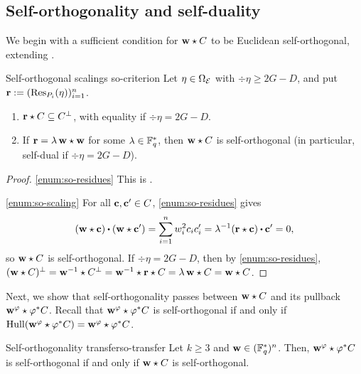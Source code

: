 \documentclass[twocolumn, 11pt]{scrartcl}
\begin{document}
\subsection{Self-orthogonality and self-duality} \label{subsection:self-dual}

We begin with a sufficient condition for $\mathbf{w}\star C$ to be Euclidean self-orthogonal, extending \cite[Lem.~3--4]{wang2026generic}.

\begin{lemma}{Self-orthogonal scalings \cite{wang2026generic}}{so-criterion}
    Let $\eta\in\Omega_\mathcal{E}$ with $\div\eta\geq2G-D$, and put $\mathbf{r}:=(\operatorname{Res}_{P_i}(\eta))_{i=1}^n$.
    \begin{enumerate}[label={(\alph*)}, left=-4pt, topsep=2pt, itemsep=0pt]
        \item \label{enum:so-residues} $\mathbf{r}\star C\subseteq C^\perp$, with equality if $\div\eta=2G-D$.
        \item \label{enum:so-scaling} If $\mathbf{r}=\lambda\,\mathbf{w}\star\mathbf{w}$ for some $\lambda\in\mathbb{F}_q^*$, then $\mathbf{w}\star C$ is self-orthogonal (in particular, self-dual if $\div\eta=2G-D$).
    \end{enumerate}
\end{lemma}

\begin{proof}
    \ref{enum:so-residues} This is \cite[Lem.~3--4]{wang2026generic}.

    \ref{enum:so-scaling} For all $\mathbf{c},\mathbf{c}'\in C$, \ref{enum:so-residues} gives
    \[ (\bfw\star\bfc)\dotpr(\bfw\star\bfc')=\sum_{i=1}^nw_i^2c_ic'_i=\lambda^{-1}(\bfr\star\bfc)\dotpr\bfc'=0, \]
    so $\mathbf{w}\star C$ is self-orthogonal. If $\div\eta=2G-D$, then by \ref{enum:so-residues}, $(\mathbf{w}\star C)^\perp=\mathbf{w}^{-1}\star C^\perp=\mathbf{w}^{-1}\star\mathbf{r}\star C=\lambda\,\mathbf{w}\star C=\mathbf{w}\star C$.
\end{proof}

Next, we show that self-orthogonality passes between $\mathbf{w}\star C$ and its pullback $\mathbf{w}^\varphi\star\varphi^*C$. Recall that $\mathbf{w}^\varphi\star\varphi^*C$ is self-orthogonal if and only if $\operatorname{Hull}(\mathbf{w}^\varphi\star\varphi^*C)=\mathbf{w}^\varphi\star\varphi^*C$.

\begin{theorem}{Self-orthogonality transfer}{so-transfer}
    Let $k\geq3$ and $\mathbf{w}\in(\mathbb{F}_q^*)^n$. Then, $\mathbf{w}^\varphi\star \varphi^*C$ is self-orthogonal if and only if $\mathbf{w}\star C$ is self-orthogonal.
\end{theorem}
\end{document}
